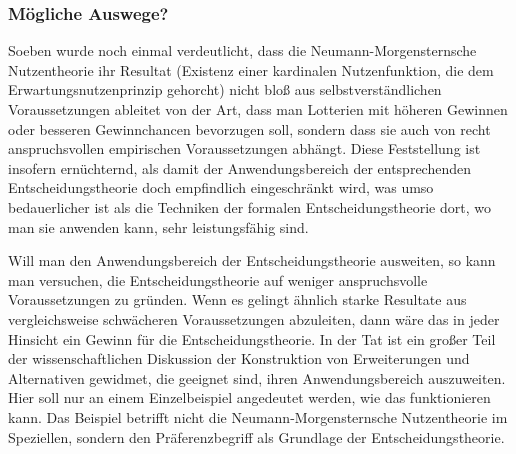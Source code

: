 \subsubsection{Mögliche Auswege?}

Soeben wurde noch einmal verdeutlicht, dass die Neumann-Morgen\-sternsche
Nutzen\-theorie ihr Resultat (Existenz einer kardinalen Nutzenfunktion, die dem
Erwartungsnutzenprinzip gehorcht) nicht bloß aus selbstverständlichen
Voraussetzungen ableitet von der Art, dass
man Lotterien mit höheren Gewinnen oder besseren Gewinnchancen bevorzugen soll,
sondern dass sie auch von recht anspruchsvollen empirischen Voraussetzungen
abhängt. Diese Feststellung ist insofern ernüchternd, als damit der
Anwendungsbereich der entsprechenden Entscheidungstheorie doch empfindlich
eingeschränkt wird, was umso bedauerlicher ist als die Techniken der formalen
Entscheidungstheorie dort, wo man sie anwenden kann, sehr leistungsfähig sind. 

Will man den Anwendungsbereich der Entscheidungstheorie ausweiten, so kann
man versuchen, die Entscheidungstheorie auf weniger
anspruchsvolle Voraussetzungen zu gründen. Wenn es gelingt ähnlich starke
Resultate aus vergleichsweise schwächeren Voraussetzungen abzuleiten, dann wäre
das in jeder Hinsicht ein Gewinn für die Entscheidungstheorie. In der Tat
ist ein großer Teil der wissenschaftlichen Diskussion der Konstruktion
von Erweiterungen und Alternativen gewidmet, die geeignet
sind, ihren Anwendungsbereich auszuweiten. Hier soll nur an einem
Einzelbeispiel angedeutet werden, wie das funktionieren kann. Das Beispiel
betrifft nicht die Neumann-Morgensternsche Nutzentheorie im Speziellen, sondern
den Präferenzbegriff als Grundlage der Entscheidungstheorie. 

